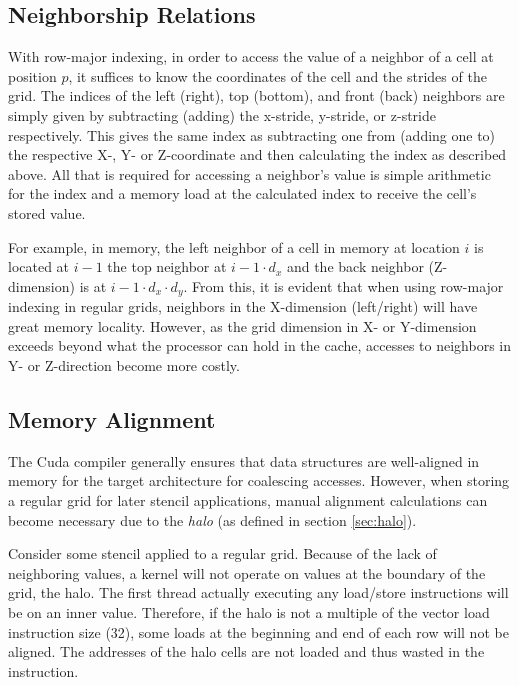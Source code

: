 \subsection{Neighborship Relations}

With row-major indexing, in order to access the value of a neighbor of a cell at position $p$, it suffices to know the coordinates of the cell and the strides of the grid. The indices of the left (right), top (bottom), and front (back) neighbors are simply given by subtracting (adding) the x-stride, y-stride, or z-stride respectively. This gives the same index as subtracting one from (adding one to) the respective X-, Y- or Z-coordinate and then calculating the index as described above. All that is required for accessing a neighbor's value is simple arithmetic for the index and a memory load at the calculated index to receive the cell's stored value.

For example, in memory, the left neighbor of a cell in memory at location $i$ is located at $i-1$ the top neighbor at $i-1\cdot d_x$ and the back neighbor (Z-dimension) is at $i-1\cdot d_x\cdot d_y$. From this, it is evident that when using row-major indexing in regular grids, neighbors in the X-dimension (left/right) will have great memory locality. However, as the grid dimension in X- or Y-dimension exceeds beyond what the processor can hold in the cache, accesses to neighbors in Y- or Z-direction become more costly. 

\subsection{Memory Alignment}

\label{sec:regular-memory-alignment}
The Cuda compiler generally ensures that data structures are well-aligned in memory for the target architecture for coalescing accesses. However, when storing a regular grid for later stencil applications, manual alignment calculations can become necessary due to the \emph{halo} (as defined in section \ref{sec:halo}). 

Consider some stencil applied to a regular grid. Because of the lack of neighboring values, a kernel will not operate on values at the boundary of the grid, the halo. The first thread actually executing any load/store instructions will be on an inner value. Therefore, if the halo is not a multiple of the vector load instruction size (32), some loads at the beginning and end of each row will not be aligned. The addresses of the halo cells are not loaded and thus wasted in the instruction.

